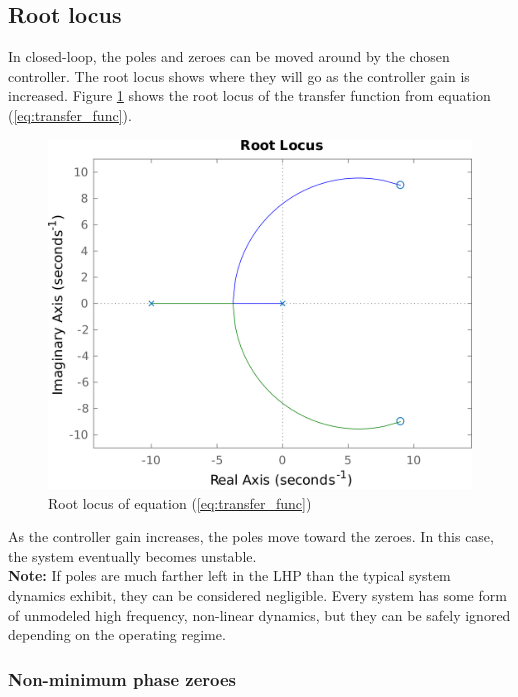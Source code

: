 \documentclass[10pt,conference,compsoc]{IEEEtran}
\begin{document}
\subsection{Root locus}

\noindent In closed-loop, the poles and zeroes can be moved around by the chosen
controller. The root locus shows where they will go as the controller gain is
increased. Figure \ref{fig:poster_rlocus} shows the root locus of the transfer
function from equation (\ref{eq:transfer_func}).

\begin{figure}[H]
  \includegraphics[width=\linewidth]{figs/poster_rlocus.png}
  \caption{Root locus of equation (\ref{eq:transfer_func})}
  \label{fig:poster_rlocus}
\end{figure}

\noindent As the controller gain increases, the poles move toward the zeroes. In
this case, the \gls{system} eventually becomes unstable. \\

\noindent \textbf{Note:} If poles are much farther left in the LHP than the
typical \gls{system} dynamics exhibit, they can be considered negligible. Every
\gls{system} has some form of unmodeled high frequency, non-linear dynamics, but
they can be safely ignored depending on the operating regime.

\subsubsection{Non-minimum phase zeroes}
\end{document}
